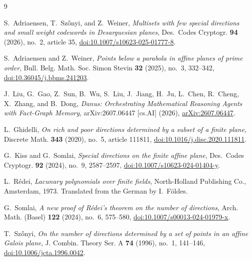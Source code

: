 \documentclass[11pt]{amsart}
\theoremstyle{remark}
\begin{document}
\begin{thebibliography}{9}

S.~Adriaensen, T.~Sz\H{o}nyi, and Z.~Weiner,
\emph{Multisets with few special directions and small weight codewords in
Desarguesian planes},
Des.\ Codes Cryptogr. \textbf{94} (2026), no.~2, article 35,
\href{https://doi.org/10.1007/s10623-025-01777-8}
{doi:10.1007/s10623-025-01777-8}.

S.~Adriaensen and Z.~Weiner,
\emph{Points below a parabola in affine planes of prime order},
Bull. Belg. Math. Soc. Simon Stevin \textbf{32} (2025), no.~3, 332--342,
\href{https://doi.org/10.36045/j.bbms.241203}
{doi:10.36045/j.bbms.241203}.

J.~Liu, G.~Gao, Z.~Sun, B.~Wu, S.~Liu, J.~Jiang, H.~Ju, L.~Chen,
R.~Cheng, X.~Zhang, and B.~Dong,
\emph{Danus: Orchestrating Mathematical Reasoning Agents with Fact-Graph
Memory}, arXiv:2607.06447 [cs.AI] (2026),
\href{https://arxiv.org/abs/2607.06447}{arXiv:2607.06447}.

L.~Ghidelli,
\emph{On rich and poor directions determined by a subset of a finite plane},
Discrete Math. \textbf{343} (2020), no.~5, article 111811,
\href{https://doi.org/10.1016/j.disc.2020.111811}
{doi:10.1016/j.disc.2020.111811}.

G.~Kiss and G.~Somlai,
\emph{Special directions on the finite affine plane},
Des.\ Codes Cryptogr. \textbf{92} (2024), no.~9, 2587--2597,
\href{https://doi.org/10.1007/s10623-024-01404-y}
{doi:10.1007/s10623-024-01404-y}.

L.~R\'edei,
\emph{Lacunary polynomials over finite fields},
North-Holland Publishing Co., Amsterdam, 1973.
Translated from the German by I.~F\"oldes.

G.~Somlai,
\emph{A new proof of R\'edei's theorem on the number of directions},
Arch. Math. (Basel) \textbf{122} (2024), no.~6, 575--580,
\href{https://doi.org/10.1007/s00013-024-01979-x}
{doi:10.1007/s00013-024-01979-x}.

T.~Sz\H{o}nyi,
\emph{On the number of directions determined by a set of points in an affine
Galois plane},
J. Combin. Theory Ser. A \textbf{74} (1996), no.~1, 141--146,
\href{https://doi.org/10.1006/jcta.1996.0042}
{doi:10.1006/jcta.1996.0042}.

\end{thebibliography}
\end{document}

